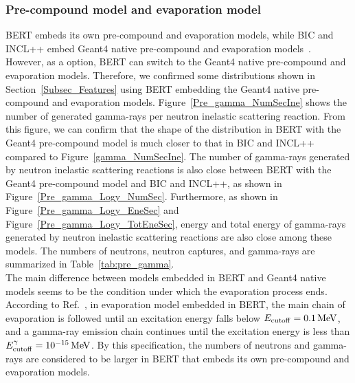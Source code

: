 \subsubsection{Pre-compound model and evaporation model}
\vs\hs
BERT embeds its own pre-compound and evaporation models, while BIC and INCL++ embed Geant4 native pre-compound and evaporation models~\cite{2011Quesada}.
However, as a option, BERT can switch to the Geant4 native pre-compound and evaporation models.
Therefore, we confirmed some distributions shown in Section~\ref{Subsec_Features} using BERT embedding the Geant4 native pre-compound and evaporation models.
Figure~\ref{Pre_gamma_NumSecIne} shows the number of generated gamma-rays per neutron inelastic scattering reaction.
From this figure, we can confirm that the shape of the distribution in BERT with the Geant4 pre-compound model is much closer to that in BIC and INCL++ compared to Figure~\ref{gamma_NumSecIne}.
The number of gamma-rays generated by neutron inelastic scattering reactions is also close between BERT with the Geant4 pre-compound model and BIC and INCL++, as shown in Figure~\ref{Pre_gamma_Logy_NumSec}.
Furthermore, as shown in Figure~\ref{Pre_gamma_Logy_EneSec} and Figure~\ref{Pre_gamma_Logy_TotEneSec}, energy and total energy of gamma-rays generated by neutron inelastic scattering reactions are also close among these models.
The numbers of neutrons, neutron captures, and gamma-rays are summarized in Table~\ref{tab:pre_gamma}.\\
\hs
The main difference between models embedded in BERT and Geant4 native models seems to be the condition under which the evaporation process ends.
According to Ref.~\cite{Geant4}, in evaporation model embedded in BERT, the main chain of evaporation is followed until an excitation energy falls below $E_{\rm cutoff} = 0.1\,{\rm MeV}$, and a gamma-ray emission chain continues until the excitation energy is less than $E^{\gamma}_{\rm cutoff} = 10^{-15}\,{\rm MeV}$.
By this specification, the numbers of neutrons and gamma-rays are considered to be larger in BERT that embeds its own pre-compound and evaporation models.

